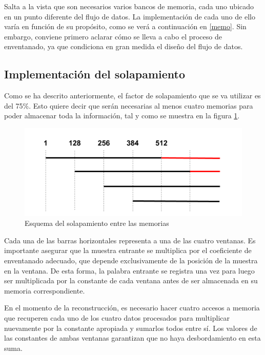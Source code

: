 Salta a la vista que son necesarios varios bancos de memoria, cada uno ubicado en un punto diferente del flujo de datos. La implementación de cada uno de ello varía en función de su propósito, como se verá a continuación en \ref{memo}. Sin embargo, conviene primero aclarar cómo se lleva a cabo el proceso de enventanado, ya que condiciona en gran medida el diseño del flujo de datos.

\subsection{Implementación del solapamiento}
Como se ha descrito anteriormente, el factor de solapamiento que se va utilizar es del 75\%. Esto quiere decir que serán necesarias al menos cuatro memorias para poder almacenar toda la información, tal y como se muestra en la figura \ref{fig:solap}. 

\begin{figure}[!b]
\begin{center}
\includegraphics[width=13cm]{img/solap.png}
\caption{\label{fig:solap}Esquema del solapamiento entre las memorias}
\end{center}
\end{figure}

Cada una de las barras horizontales representa a una de las cuatro ventanas. Es importante asegurar que la muestra entrante se multiplica por el coeficiente de enventanado adecuado, que depende exclusivamente de la posición de la muestra en la ventana. De esta forma, la palabra entrante se registra una vez para luego ser multiplicada por la constante de cada ventana antes de ser almacenada en su memoria correspondiente.

En el momento de la reconstrucción, es necesario hacer cuatro accesos a memoria que recuperen cada uno de los cuatro datos procesados para multiplicar nuevamente por la constante apropiada y sumarlos todos entre sí. Los valores de las constantes de ambas ventanas garantizan que no haya desbordamiento en esta suma.

